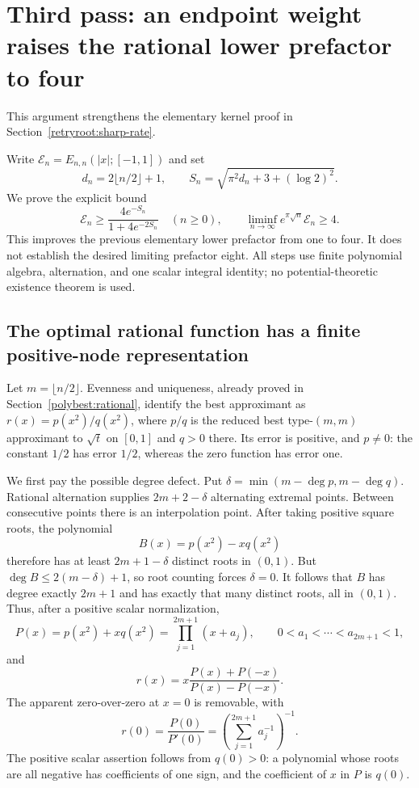 \documentclass[11pt]{article}
\theoremstyle{remark}
\numberwithin{equation}{section}
\begin{document}


\section{Third pass: an endpoint weight raises the rational lower prefactor to four}
\label{thirdstahl:main}
This argument strengthens the elementary kernel proof in
Section~\ref{retryroot:sharp-rate}.

Write $\mathcal E_n=E_{n,n}(|x|;[-1,1])$ and set
\[
 d_n=2\lfloor n/2\rfloor+1,
 \qquad S_n=\sqrt{\pi^2d_n+3+(\log2)^2}.
\]
We prove the explicit bound
\begin{equation}\label{thirdstahl:four-finite}
 \boxed{\mathcal E_n\ge
 \frac{4e^{-S_n}}{1+4e^{-2S_n}}\quad(n\ge0),
 \qquad
 \liminf_{n\to\infty}e^{\pi\sqrt n}\mathcal E_n\ge4.}
\end{equation}
This improves the previous elementary lower prefactor from one to
four.  It does not establish the desired limiting prefactor eight.
All steps use finite polynomial algebra, alternation, and one scalar
integral identity; no potential-theoretic existence theorem is used.

\subsection{The optimal rational function has a finite positive-node representation}
\label{thirdstahl:positive-nodes}
Let $m=\lfloor n/2\rfloor$.  Evenness and uniqueness, already proved in
Section~\ref{polybest:rational}, identify the best approximant as
$r(x)=p(x^2)/q(x^2)$, where $p/q$ is the reduced best type-$(m,m)$
approximant to $\sqrt t$ on $[0,1]$ and $q>0$ there.
Its error is positive, and $p\ne0$: the constant $1/2$ has error
$1/2$, whereas the zero function has error one.

We first pay the possible degree defect.  Put
$\delta=\min(m-\deg p,m-\deg q)$.  Rational alternation supplies
$2m+2-\delta$ alternating extremal points.  Between consecutive points
there is an interpolation point.  After taking positive square roots,
the polynomial
\[
 B(x)=p(x^2)-xq(x^2)
\]
therefore has at least $2m+1-\delta$ distinct roots in $(0,1)$.
But $\deg B\le2(m-\delta)+1$, so root counting forces $\delta=0$.
It follows that $B$ has degree exactly $2m+1$ and has exactly that many
distinct roots, all in $(0,1)$.  Thus, after a positive scalar
normalization,
\begin{equation}\label{thirdstahl:positive-product}
 P(x)=p(x^2)+xq(x^2)=\prod_{j=1}^{2m+1}(x+a_j),
 \qquad 0<a_1<\cdots<a_{2m+1}<1,
\end{equation}
and
\begin{equation}\label{thirdstahl:product-rational}
 r(x)=x\frac{P(x)+P(-x)}{P(x)-P(-x)}.
\end{equation}
The apparent zero-over-zero at $x=0$ is removable, with
\[
 r(0)=\frac{P(0)}{P'(0)}
     =\left(\sum_{j=1}^{2m+1}a_j^{-1}\right)^{-1}.
\]
The positive scalar assertion follows from $q(0)>0$: a polynomial
whose roots are all negative has coefficients of one sign, and the
coefficient of $x$ in $P$ is $q(0)$.
\end{document}
